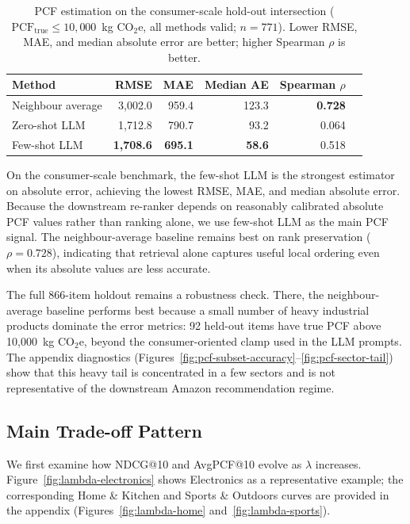 \documentclass[11pt]{article}
\begin{document}
\begin{table}[H]
\centering
\small
\begin{tabular}{lrrrrr}
\hline
Method & RMSE & MAE & Median AE & Spearman $\rho$ \\
\hline
Neighbour average & 3{,}002.0 & 959.4 & 123.3 & \textbf{0.728} \\
Zero-shot LLM & 1{,}712.8 & 790.7 & 93.2 & 0.064 \\
Few-shot LLM & \textbf{1{,}708.6} & \textbf{695.1} & \textbf{58.6} & 0.518 \\
\hline
\end{tabular}
\caption{PCF estimation on the consumer-scale hold-out intersection
($\mathrm{PCF}_{\mathrm{true}} \leq 10{,}000$~kg CO$_2$e, all methods
valid; $n=771$). Lower RMSE, MAE, and median absolute error are better;
higher Spearman $\rho$ is better.}
\label{tab:pcf}
\end{table}

On the consumer-scale benchmark, the few-shot LLM is the strongest estimator on absolute
error, achieving the lowest RMSE, MAE, and median absolute error. Because the downstream
re-ranker depends on reasonably calibrated absolute PCF values rather than ranking alone,
we use few-shot LLM as the main PCF signal. The neighbour-average baseline remains best on
rank preservation ($\rho=0.728$), indicating that retrieval alone captures useful local
ordering even when its absolute values are less accurate.

The full 866-item holdout remains a robustness check. There, the neighbour-average
baseline performs best because a small number of heavy industrial products dominate the
error metrics: 92 held-out items have true PCF above 10{,}000~kg CO$_2$e, beyond the
consumer-oriented clamp used in the LLM prompts. The appendix diagnostics
(Figures~\ref{fig:pcf-subset-accuracy}--\ref{fig:pcf-sector-tail}) show that this heavy
tail is concentrated in a few sectors and is not representative of the downstream Amazon
recommendation regime.

\subsection{Main Trade-off Pattern}
\label{sec:lambda-results}

We first examine how NDCG@10 and AvgPCF@10 evolve as $\lambda$ increases. Figure~\ref{fig:lambda-electronics}
shows Electronics as a representative example; the corresponding Home \& Kitchen and Sports
\& Outdoors curves are provided in the appendix (Figures~\ref{fig:lambda-home}
and~\ref{fig:lambda-sports}).
\end{document}
